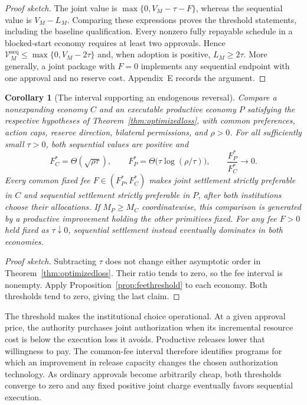 \documentclass[ecta,draft]{econsocart}
\newtheorem{corollary}[theorem]{Corollary}
\theoremstyle{definition}
\theoremstyle{definition}
\begin{document}
\begin{proof}[Proof sketch]
The joint value is $\max\{0,V_M-\tau-F\}$, whereas the
sequential value is $V_M-L_M$. Comparing these expressions proves
the threshold statements, including the baseline qualification.
Every nonzero fully repayable schedule in a blocked-start economy
requires at least two approvals. Hence
$\mathcal V_M^{\mathrm{seq}}\leq\max\{0,V_M-2\tau\}$ and,
when adoption is positive, $L_M\geq2\tau$. More generally, a joint
package with $F=0$ implements any sequential endpoint with one approval
and no reserve cost. Appendix~E%
 records the argument.
\end{proof}

\begin{corollary}[The interval supporting an endogenous reversal]
\label{cor:optimizedreversal}\label{thm:generalreversal}
Compare a nonexpanding economy $C$ and an executable productive economy
$P$ satisfying the respective hypotheses of
Theorem~\ref{thm:optimizedloss}, with common preferences, action caps,
reserve direction, bilateral permissions, and $\rho>0$. For all
sufficiently small $\tau>0$, both sequential values are positive and
\[
 F_C^*=\Theta(\sqrt{\rho\tau}),\qquad
 F_P^*=\Theta\bigl(\tau\log(\rho/\tau)\bigr),
 \qquad \frac{F_P^*}{F_C^*}\longrightarrow0.
\]
Every common fixed fee $F\in(F_P^*,F_C^*)$ makes joint settlement
strictly preferable in $C$ and sequential settlement strictly preferable
in $P$, after both institutions choose their allocations. If
$M_P\geq M_C$ coordinatewise, this comparison is generated by a
productive improvement holding the other primitives fixed.
For any fee $F>0$ held fixed as $\tau\downarrow0$, sequential settlement
instead eventually dominates in both economies.
\end{corollary}

\begin{proof}[Proof sketch]
Subtracting $\tau$ does not change either asymptotic order in
Theorem~\ref{thm:optimizedloss}. Their ratio tends to zero, so the
fee interval is nonempty. Apply Proposition~\ref{prop:feethreshold}
to each economy. Both thresholds tend to zero, giving the last claim.
\end{proof}

The threshold makes the institutional choice operational. At a given
approval price, the authority purchases joint authorization when its
incremental resource cost is below the execution loss it avoids. Productive
releases lower that willingness to pay. The common-fee interval therefore
identifies programs for which an improvement in release capacity changes
the chosen authorization technology. As ordinary approvals become arbitrarily
cheap, both thresholds converge to zero and any fixed positive joint charge
eventually favors sequential execution.
\end{document}
